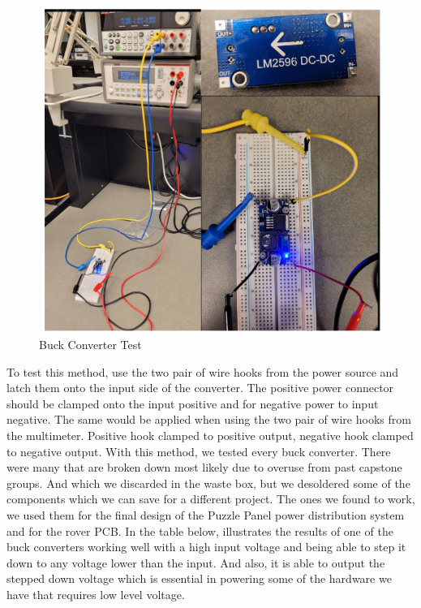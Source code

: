 \documentclass[a4paper, 10pt]{article}
\begin{document}
		\begin{figure} [!h]
			\centering
			\includegraphics[scale=0.7]{Photos/LM2956 Testing Picture}
			\caption{Buck Converter Test}
			\label{buck_test}
		\end{figure}

	To test this method, use the two pair of wire hooks from the power source and latch them onto the input side of the converter. The positive power connector should be clamped onto the input positive and for negative power to input negative. The same would be applied when using the two pair of wire hooks from the multimeter. Positive hook clamped to positive output, negative hook clamped to negative output. With this method, we tested every buck converter. There were many that are broken down most likely due to overuse from past capstone groups. And which we discarded in the waste box, but we desoldered some of the components which we can save for a different project. The ones we found to work, we used them for the final design of the Puzzle Panel power distribution system and for the rover PCB. In the table below, illustrates the results of one of the buck converters working well with a high input voltage and being able to step it down to any voltage lower than the input. And also, it is able to output the stepped down voltage which is essential in powering some of the hardware we have that requires low level voltage.
\end{document}
